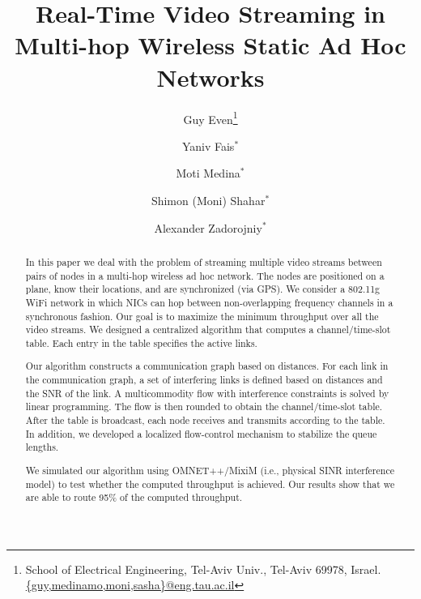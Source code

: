 \documentclass[12pt]{article}
\newenvironment{proof sketch}[1]{\noindent {\emph{Proof sketch of #1:}}}{\hfill \qed}
\begin{document}
\title{Real-Time Video Streaming in Multi-hop Wireless Static Ad Hoc Networks}

\ifnum{}
\author{%
Guy Even\thanks{School of Electrical Engineering,
Tel-Aviv Univ., Tel-Aviv 69978, Israel.
\protect\url{{guy,medinamo,moni,sasha}@eng.tau.ac.il}}
\and
Yaniv Fais$^*$
\and
Moti Medina$^*$
%
\and Shimon (Moni) Shahar$^*$
\and Alexander Zadorojniy$^*$ }
\fi
\date{}

\maketitle



\begin{abstract}
  In this paper we deal with the problem of streaming multiple video
  streams between pairs of nodes in a multi-hop wireless ad hoc
  network.  The nodes are positioned on a plane, know their locations,
  and are synchronized (via GPS). We consider a 802.11g WiFi network
  in which NICs can hop between non-overlapping frequency channels in
  a synchronous fashion. Our goal is to maximize the minimum
  throughput over all the video streams. We designed a centralized
  algorithm that computes a channel/time-slot table.  Each entry in
  the table specifies the active links.

  Our algorithm constructs a communication graph based on distances.
  For each link in the communication graph, a set of interfering links
  is defined based on distances and the SNR of the link.  A
  multicommodity flow with interference constraints is solved by
  linear programming. The flow is then rounded to obtain the
  channel/time-slot table. After the table is broadcast, each node
  receives and transmits according to the table. In addition, we developed a localized
  flow-control mechanism to stabilize the queue lengths.

  We simulated our algorithm using OMNET++/MixiM (i.e., physical SINR
  interference model) to test whether the computed throughput is
  achieved. Our results show that we are able to route 95\% of the
  computed throughput.
\end{abstract}

\end{document}

